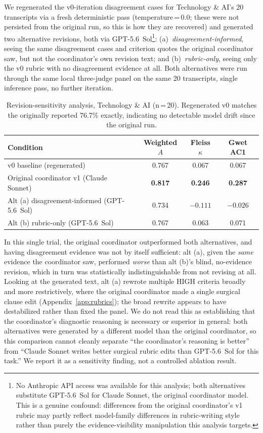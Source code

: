\documentclass[11pt]{article}
\begin{document}
We regenerated the v0-iteration disagreement cases for Technology \& AI's
20 transcripts via a fresh deterministic pass (temperature\,=\,0.0; these
were not persisted from the original run, so this is how they are
recovered) and generated two alternative revisions, both via
GPT-5.6~Sol\footnote{No Anthropic API access was available for this
analysis; both alternatives substitute GPT-5.6~Sol for Claude Sonnet, the
original coordinator model. This is a genuine confound: differences from
the original coordinator's v1 rubric may partly reflect model-family
differences in rubric-writing style rather than purely the evidence-visibility
manipulation this analysis targets.}: (a)~\emph{disagreement-informed}, seeing
the same disagreement cases and criterion quotes the original coordinator
saw, but not the coordinator's own revision text; and (b)~\emph{rubric-only},
seeing only the v0 rubric with no disagreement evidence at all. Both
alternatives were run through the same local three-judge panel on the same
20 transcripts, single inference pass, no further iteration.

\begin{table}[ht]
\centering
\caption{Revision-sensitivity analysis, Technology \& AI (n\,=\,20).
Regenerated v0 matches the originally reported 76.7\% exactly, indicating
no detectable model drift since the original run.}
\label{tab:revsensitivity}
\small
\begin{tabular}{lccc}
\toprule
\textbf{Condition} & \textbf{Weighted $A$} & \textbf{Fleiss $\kappa$} & \textbf{Gwet AC1} \\
\midrule
v0 baseline (regenerated) & 0.767 & 0.067 & 0.067 \\
Original coordinator v1 (Claude Sonnet) & \textbf{0.817} & \textbf{0.246} & \textbf{0.287} \\
Alt (a) disagreement-informed (GPT-5.6~Sol) & 0.734 & $-0.111$ & $-0.026$ \\
Alt (b) rubric-only (GPT-5.6~Sol) & 0.767 & 0.063 & 0.071 \\
\bottomrule
\end{tabular}
\end{table}

In this single trial, the original coordinator outperformed both
alternatives, and having disagreement evidence was not by itself
sufficient: alt (a), given the \emph{same} evidence the coordinator saw,
performed \emph{worse} than alt (b)'s blind, no-evidence revision, which in
turn was statistically indistinguishable from not revising at all. Looking
at the generated text, alt (a) rewrote multiple HIGH criteria broadly and
more restrictively, where the original coordinator made a single surgical
clause edit (Appendix~\ref{app:rubrics}); the broad rewrite appears to have
destabilized rather than fixed the panel. We do not read this as
establishing that the coordinator's diagnostic reasoning is necessary or
superior in general: both alternatives were generated by a different model
than the original coordinator, so this comparison cannot cleanly separate
``the coordinator's reasoning is better'' from ``Claude Sonnet writes
better surgical rubric edits than GPT-5.6~Sol for this task.'' We report it
as a sensitivity finding, not a controlled ablation result.
\end{document}
